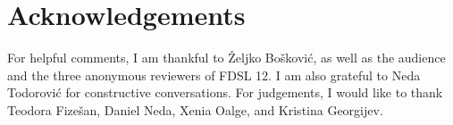 \documentclass[output=paper,hidelinks,newtxmath,]{langscibook}
\begin{document}
\section*{Acknowledgements}

For helpful comments, I am thankful to Željko Bošković, as well as the audience and the three anonymous reviewers of FDSL 12. I am also grateful to Neda Todorović for constructive conversations. For judgements, I would like to thank Teodora Fizešan, Daniel Neda, Xenia Oalge, and Kristina Georgijev.

\sloppy
\printbibliography[heading=subbibliography,notkeyword=this]
\end{document}
